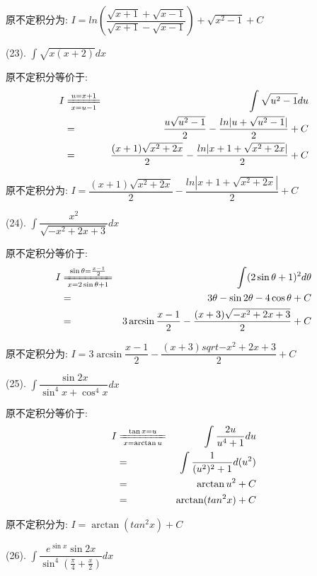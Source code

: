 \begin{anymark}[积分训练]
\begin{solution}
		原不定积分为:  $I=ln\left(\dfrac{\sqrt{x+1}+\sqrt{x-1}}{\sqrt{x+1}-\sqrt{x-1}} \right)+\sqrt{x^2-1}+C$
	\end{solution}
	(23). $\int \sqrt{x(x+2)}dx$
	\begin{solution}
		
		原不定积分等价于:  
		\begin{eqnarray*}
			I&\xlongequal[x=u-1]{u=x+1}&\int \sqrt{u^2-1}du\\
			&=&\dfrac{u\sqrt{u^2-1}}{2}-\dfrac{ln|u+\sqrt{u^2-1}|}{2}+C\\
			&=&\dfrac{(x+1)\sqrt{x^2+2x}}{2}-\dfrac{ln|x+1+\sqrt{x^2+2x}|}{2}+C
		\end{eqnarray*}
		
		原不定积分为:  $I=\dfrac{(x+1)\sqrt{x^2+2x}}{2}-\dfrac{ln|x+1+\sqrt{x^2+2x}|}{2}+C$
	\end{solution}
	(24). $\int \dfrac{x^2}{\sqrt{-x^2+2x+3}}dx$
	\begin{solution}
		
		原不定积分等价于:  
		\begin{eqnarray*}
			I&\xlongequal[x=2\sin\theta+1]{\sin\theta=\frac{x-1}{2}}&\int (2\sin\theta+1)^2d\theta\\
			&=&3\theta-\sin2\theta-4\cos\theta+C\\
			&=&3\arcsin\dfrac{x-1}{2}-\dfrac{(x+3)\sqrt{-x^2+2x+3}}{2}+C
		\end{eqnarray*}
		
		原不定积分为:  $I=3\arcsin\dfrac{x-1}{2}-\dfrac{(x+3)sqrt{-x^2+2x+3}}{2}+C$
	\end{solution}
	(25). $\int \dfrac{\sin 2x}{\sin^4 x+\cos^4 x}dx$
	\begin{solution}
		
		原不定积分等价于:  
		\begin{eqnarray*}
			I&\xlongequal[x=\arctan u]{\tan x=u}&\int \dfrac{2u}{u^4+1}du\\
			&=&\int \dfrac{1}{(u^2)^2+1}d(u^2)\\
			&=&\arctan u^2+C\\
			&=&\arctan(tan^2 x)+C
		\end{eqnarray*}
		
		原不定积分为:  $I=\arctan(tan^2 x)+C$
	\end{solution}
	(26). $\int \dfrac{e^{\sin x}\sin 2x}{\sin^4(\frac{\pi}{4}+\frac{x}{2})}dx$
	\begin{solution}
		

\end{solution}
\end{anymark}
